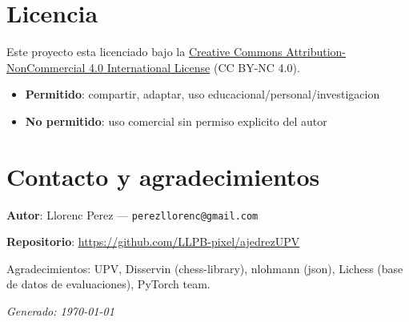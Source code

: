 \documentclass[11pt,a4paper]{article}
\begin{document}
\section{Licencia}

Este proyecto esta licenciado bajo la
\href{https://creativecommons.org/licenses/by-nc/4.0/}{Creative Commons
Attribution-NonCommercial 4.0 International License} (CC BY-NC 4.0).

\begin{itemize}
  \item \textbf{Permitido}: compartir, adaptar, uso educacional/personal/investigacion
  \item \textbf{No permitido}: uso comercial sin permiso explicito del autor
\end{itemize}

\section{Contacto y agradecimientos}

\textbf{Autor}: Llorenc Perez --- \texttt{perezllorenc@gmail.com}

\textbf{Repositorio}: \url{https://github.com/LLPB-pixel/ajedrezUPV}

Agradecimientos: UPV, Disservin (chess-library), nlohmann (json), Lichess
(base de datos de evaluaciones), PyTorch team.

\vfill
\begin{center}
\textit{Generado: \today}
\end{center}
\end{document}
